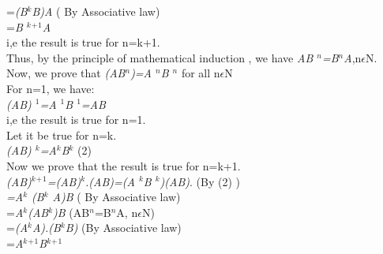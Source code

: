 \documentclass[a4paper,12pt]{article}
\begin{document}
               \hspace{4cm} =\textit{(B$^k$B)A} \hspace{2cm}( By Associative law)\\

                \hspace{4cm} =\textit{B $^k$$^+$$^1$A}\\

i,e the result is true for n=k+1.\\

Thus, by the principle of mathematical induction , 
we have \textit{AB $^n$=B$^n$A},n$\epsilon$N.\\

Now, we prove that \textit{(AB$^n$)=A $^n$B $^n$} for all n$\epsilon$N\\

For n=1, we have:\\

\textit{(AB) $^1$=A $^1$B $^1$=AB}\\

i,e the result is true for n=1.\\

Let it be true for n=k.\\

\textit{(AB) $^k$=A$^k$B$^k$}     \hspace{4cm}(2)\\

Now we prove that the result is true for n=k+1.\\

\textit{(AB)$^k$$^+$$^1$=(AB)$^k$.(AB)=(A $^k$B $^k$)(AB)}.\hspace{2cm} (By (2) )\\

            \hspace{4cm} \textit{=A$^k$ (B$^k$ A)B} \hspace{2cm}( By Associative law)\\

           \hspace{4cm} =\textit{A$^k$(AB$^k$)B}     \hspace{2cm}(AB$^n$=B$^n$A, n$\epsilon$N)\\

            \hspace{4cm}=\textit{(A$^k$A).(B$^k$B)} \hspace{2cm}(By Associative law)\\

            \hspace{4cm}=\textit{A$^k$$^+$$^1$B$^k$$^+$$^1$}\\ 
\end{document}
